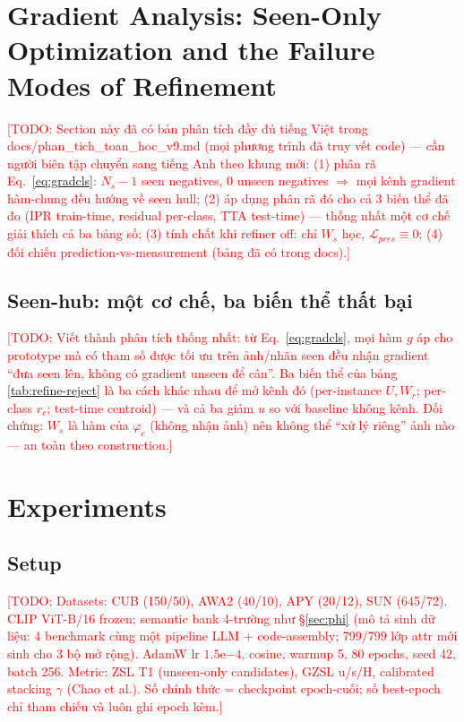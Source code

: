 \documentclass[10pt,twocolumn,letterpaper]{article}
\newcommand{\todo}[1]{\textcolor{red}{[TODO: #1]}}
\begin{document}
\section{Gradient Analysis: Seen-Only Optimization and the Failure Modes of Refinement}
\label{sec:analysis}
\todo{Section này đã có bản phân tích đầy đủ tiếng Việt trong docs/phan\_tich\_toan\_hoc\_v9.md (mọi phương trình đã truy vết code) — cần người biên tập chuyển sang tiếng Anh theo khung mới: (1) phân rã Eq.~\eqref{eq:gradcls}: $N_s{-}1$ seen negatives, 0 unseen negatives $\Rightarrow$ mọi kênh gradient hàm-chung đều hướng về seen hull; (2) áp dụng phân rã đó cho cả 3 biến thể đã đo (IPR train-time, residual per-class, TTA test-time) — thống nhất một cơ chế giải thích cả ba bảng số; (3) tính chất khi refiner off: chỉ $W_s$ học, $\mathcal L_{pres}\equiv 0$; (4) đối chiếu prediction-vs-measurement (bảng đã có trong docs).}

\subsection{Seen-hub: một cơ chế, ba biến thể thất bại}
\label{sec:analysis:ipr}
\todo{Viết thành phân tích thống nhất: từ Eq.~\eqref{eq:gradcls}, mọi hàm $g$ áp cho prototype mà có tham số được tối ưu trên ảnh/nhãn seen đều nhận gradient ``đưa seen lên, không có gradient unseen để cân''. Ba biến thể của bảng \ref{tab:refine-reject} là ba cách khác nhau để mở kênh đó (per-instance $U,W_r$; per-class $r_c$; test-time centroid) — và cả ba giảm $u$ so với baseline không kênh. Đối chứng: $W_s$ là hàm của $\varphi_c$ (không nhận ảnh) nên không thể ``xử lý riêng'' ảnh nào — an toàn theo construction.}

\section{Experiments}
\label{sec:exp}

\subsection{Setup}
\todo{Datasets: CUB (150/50), AWA2 (40/10), APY (20/12), SUN (645/72). CLIP ViT-B/16 frozen; semantic bank 4-trường như §\ref{sec:phi} (mô tả sinh dữ liệu: 4 benchmark cùng một pipeline LLM + code-assembly; 799/799 lớp attr mới sinh cho 3 bộ mở rộng). AdamW lr $1.5$e$-4$, cosine, warmup 5, 80 epochs, seed 42, batch 256. Metric: ZSL T1 (unseen-only candidates), GZSL u/s/H, calibrated stacking $\gamma$ (Chao et al.). Số chính thức = checkpoint epoch-cuối; số best-epoch chỉ tham chiếu và luôn ghi epoch kèm.}
\end{document}
